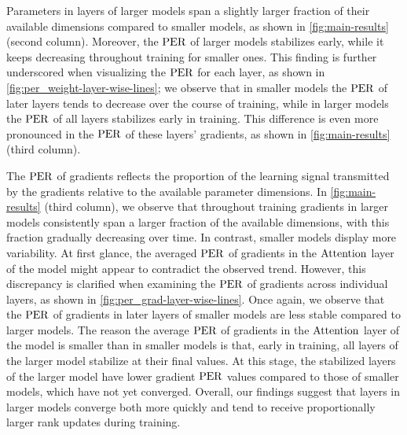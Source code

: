 \begin{result} 
    \label{result:weight-effective-rank} 
    Parameters in layers of larger models span a slightly larger fraction of their available dimensions compared to smaller models, as shown in \cref{fig:main-results} (second column). 
    Moreover, the $\mathrm{PER}$ of larger models stabilizes early, while it keeps decreasing throughout training for smaller ones. This finding is further underscored when visualizing the $\mathrm{PER}$ for each layer, as shown in \cref{fig:per_weight-layer-wise-lines}; we observe that in smaller models the $\mathrm{PER}$ of later layers tends to decrease over the course of training, while in larger models the $\mathrm{PER}$ of all layers stabilizes early in training. This difference is even more pronounced in the $\mathrm{PER}$ of these layers' gradients, as shown in \cref{fig:main-results} (third column).
    \end{result}
    
    \begin{result}
    \label{result}
    The $\mathrm{PER}$ of gradients reflects the proportion of the learning signal transmitted by the gradients relative to the available parameter dimensions. In \cref{fig:main-results} (third column), we observe that throughout training gradients in larger models consistently span a larger fraction of the available dimensions, with this fraction gradually decreasing over time. In contrast, smaller models display more variability. At first glance, the averaged $\mathrm{PER}$ of gradients in the $\mathrm{Attention}$ layer of the \twobil model might appear to contradict the observed trend. However, this discrepancy is clarified when examining the $\mathrm{PER}$ of gradients across individual layers, as shown in \cref{fig:per_grad-layer-wise-lines}. Once again, we observe that the $\mathrm{PER}$ of gradients in later layers of smaller models are less stable compared to larger models. The reason the average $\mathrm{PER}$ of gradients in the $\mathrm{Attention}$ layer of the \twobil model is smaller than in smaller models is that, early in training, all layers of the larger model stabilize at their final values. At this stage, the stabilized layers of the larger model have lower gradient $\mathrm{PER}$ values compared to those of smaller models, which have not yet converged. Overall, our findings suggest that layers in larger models converge both more quickly and tend to receive proportionally larger rank updates during training.
    \end{result}

